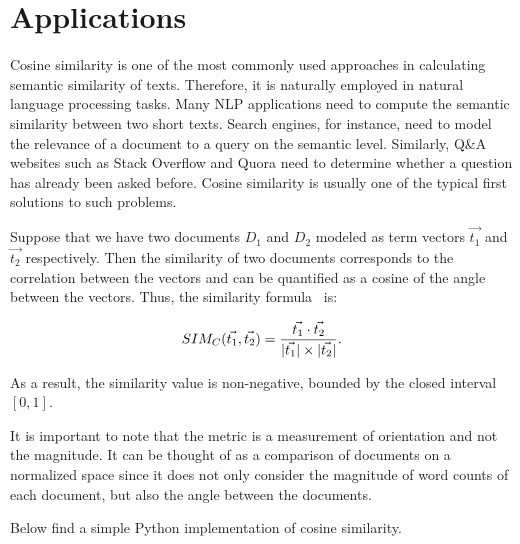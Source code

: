 \documentclass[11pt]{article}
\DeclarePairedDelimiter\abs{\lvert}{\rvert}
\begin{document}

\section{Applications}

Cosine similarity is one of the most commonly used approaches in calculating
semantic similarity of texts. Therefore, it is naturally employed in natural
language processing tasks. Many NLP applications need to compute the semantic
similarity between two short texts. Search engines, for instance, need to model
the relevance of a document to a query on the semantic level. Similarly, Q\&A
websites such as Stack Overflow and Quora need to determine whether a question
has already been asked before. Cosine similarity is usually one of the typical
first solutions to such problems.

\bigskip

Suppose that we have two documents \(D_1\) and \(D_2\) modeled as term vectors
\(\vec{t_1}\) and \(\vec{t_2}\) respectively. Then the similarity of two
documents corresponds to the correlation between the vectors and can be
quantified as a cosine of the angle between the vectors. Thus, the similarity
formula~\cite{huang2008} is:

\[SIM_C(\vec{t_1}, \vec{t_2}) = \dfrac{\vec{t_1} \cdot
  \vec{t_2}}{\abs{\vec{t_1}} \times \abs{\vec{t_2}}}.\]

As a result, the similarity value is non-negative, bounded by the closed
interval \([0,1]\).

\bigskip

It is important to note that the metric is a measurement of orientation and not
the magnitude. It can be thought of as a comparison of documents on a
normalized space since it does not only consider the magnitude of word counts
of each document, but also the angle between the documents.

\bigskip

Below find a simple Python implementation of cosine similarity.
\end{document}
